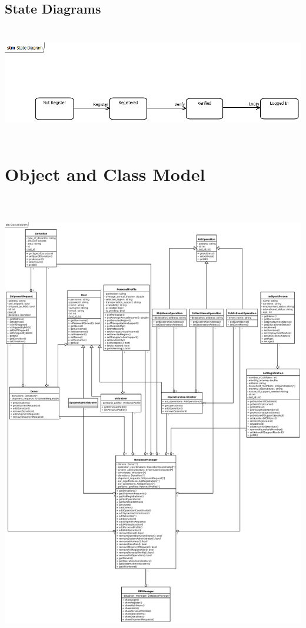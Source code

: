 \documentclass[a4paper,12pt]{report}
\begin{document}
		\subsection{State Diagrams}
			\includegraphics[width=455pt,height=139pt]{State_Diagram.png}
	\section{Object and Class Model}
		\includegraphics[width=414pt,height=575pt]{class_diagram.png}
\end{document}
